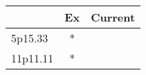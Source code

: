 \begin{tabular}{lcc}
\toprule
{} & Ex & Current \\
\midrule
5p15.33  &  * &         \\
11p11.11 &  * &         \\
\bottomrule
\end{tabular}
